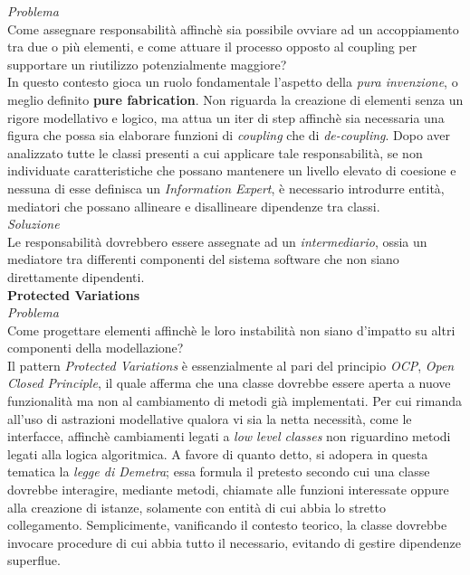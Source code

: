 \documentclass{article}
\begin{document}
\textit{Problema}\\
Come assegnare responsabilità affinchè sia possibile ovviare ad un accoppiamento tra due o più elementi, e come attuare il processo opposto al coupling per supportare un riutilizzo potenzialmente maggiore?\vspace*{14pt}\\
In questo contesto gioca un ruolo fondamentale l'aspetto della \textit{pura invenzione}, o meglio definito \textbf{pure fabrication}. Non riguarda la creazione di elementi senza un rigore modellativo e logico, ma attua un iter di step affinchè sia necessaria una figura che possa sia elaborare funzioni di \textit{coupling} che di \textit{de-coupling}. Dopo aver analizzato tutte le classi presenti a cui applicare tale responsabilità, se non individuate caratteristiche che possano mantenere un livello elevato di coesione e nessuna di esse definisca un \textit{Information Expert}, è necessario introdurre entità, mediatori che possano allineare e disallineare dipendenze tra classi.\vspace*{14pt}\\
\textit{Soluzione}\\
Le responsabilità dovrebbero essere assegnate ad un \textit{intermediario}, ossia un mediatore tra differenti componenti del sistema software che non siano direttamente dipendenti.\vspace*{14pt}\\
\textbf{Protected Variations}\vspace*{7pt}\\
\textit{Problema}\\
Come progettare elementi affinchè le loro instabilità non siano d'impatto su altri componenti della modellazione?\vspace*{14pt}\\
Il pattern \textit{Protected Variations} è essenzialmente al pari del principio \textit{OCP}, \textit{Open Closed Principle}, il quale afferma che una classe dovrebbe essere aperta a nuove funzionalità ma non al cambiamento di metodi già implementati. Per cui rimanda all'uso di astrazioni modellative qualora vi sia la netta necessità, come le interfacce, affinchè cambiamenti legati a \textit{low level classes} non riguardino metodi legati alla logica algoritmica. A favore di quanto detto, si adopera in questa tematica la \textit{legge di Demetra}; essa formula il pretesto secondo cui una classe dovrebbe interagire, mediante metodi, chiamate alle funzioni interessate oppure alla creazione di istanze, solamente con entità di cui abbia lo stretto collegamento. Semplicimente, vanificando il contesto teorico, la classe dovrebbe invocare procedure di cui abbia tutto il necessario, evitando di gestire dipendenze superflue.\vspace*{14pt}\\
\end{document}
